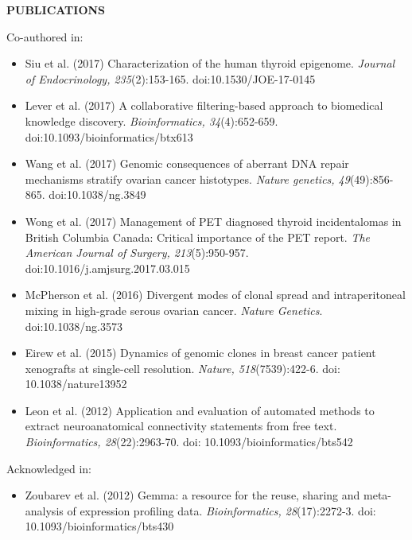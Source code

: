 \documentclass{res}
\renewcommand{\section}[1]{%
  \vspace{0.3in}%
  \centerline{\uppercase{\bf{#1}}}%
  \vspace{-6pt}}
\newenvironment{publicationlists}{%
  \begin{itemize}\leftmargin=3em \itemindent=-1em \itemsep=2pt%
  }{%
  \end{itemize}}
\begin{document}
\begin{resume}
\section{Publications}

Co-authored in:\vspace{4pt}
\begin{publicationlists}
  \item Siu et al. (2017) Characterization of the human thyroid epigenome. {\sl Journal of Endocrinology, 235}(2):153-165. doi:10.1530/JOE-17-0145
  \item Lever et al. (2017) A collaborative filtering-based approach to biomedical knowledge discovery. {\sl Bioinformatics, 34}(4):652-659. doi:10.1093/bioinformatics/btx613
  \item Wang et al. (2017) Genomic consequences of aberrant DNA repair mechanisms stratify ovarian cancer histotypes. {\sl Nature genetics, 49}(49):856-865. doi:10.1038/ng.3849
  \item Wong et al. (2017) Management of PET diagnosed thyroid incidentalomas in British Columbia Canada: Critical importance of the PET report. {\sl The American Journal of Surgery, 213}(5):950-957.\\doi:10.1016/j.amjsurg.2017.03.015
  \item McPherson et al. (2016) Divergent modes of clonal spread and intraperitoneal mixing in high-grade serous ovarian cancer. {\sl Nature Genetics}. doi:10.1038/ng.3573
  \item Eirew et al. (2015) Dynamics of genomic clones in breast cancer patient xenografts at single-cell resolution. {\sl Nature, 518}(7539):422-6. doi: 10.1038/nature13952
  \item Leon et al. (2012) Application and evaluation of automated methods to extract neuroanatomical connectivity statements from free text. {\sl Bioinformatics, 28}(22):2963-70. doi: 10.1093/bioinformatics/bts542
\end{publicationlists}

Acknowledged in:\vspace{4pt}
\begin{publicationlists}
  \item Zoubarev et al. (2012) Gemma: a resource for the reuse, sharing and meta-analysis of expression profiling data. {\sl Bioinformatics, 28}(17):2272-3. doi: 10.1093/bioinformatics/bts430
\end{publicationlists}


\end{resume}
\end{document}
